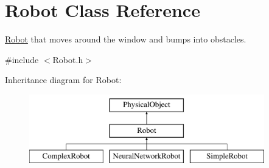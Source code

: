 \hypertarget{classRobot}{\section{Robot Class Reference}
\label{classRobot}
}


\hyperlink{classRobot}{Robot} that moves around the window and bumps into obstacles.  




{\ttfamily \#include $<$Robot.\-h$>$}

Inheritance diagram for Robot\-:\begin{figure}[H]
\begin{center}
\leavevmode
\includegraphics[height=3.000000cm]{classRobot}
\end{center}
\end{figure}
